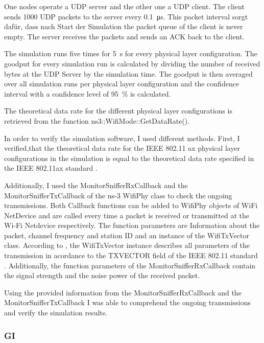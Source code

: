 One nodes operate a UDP server and the other one a UDP client. The client sends \SI{1000}{\byte} UDP packets to the server every \SI{0.1}{\micro\second}. This packet interval
sorgt dafür, dass nach Start der Simulation the packet queue of the client is never empty. The server receives the packets and sends an ACK back to the client.

The simulation runs five times for \SI{5}{\second} for every physical layer configuration.
The goodput for every simulation run is calculated by dividing the number of received bytes at the UDP Server by the simulation time.
The goodput is then averaged over all simulation runs per physical layer configuration and the confidence interval with a confidence level of
\SI{95}{\percent} is calculated.

The theoretical data rate for the different physical layer configurations is retrieved from the function ns3::WifiMode::GetDataRate().

In order to verify the simulation software, I used different methods. First, I verified,that the theoretical data rate for the IEEE 802.11 ax physical layer configurations in
the simulation is equal to the theoretical data rate specified in the IEEE 802.11ax standard \cite{noauthor_ieee_2021}.

Additionally, I used the MonitorSnifferRxCallback and the MonitorSnifferTxCallback of the ns-3 WifiPhy class to check the ongoing transmissions.
Both Callback functions can be added to WifiPhy objects of WiFi NetDevice and are called every time a packet is received or transmitted at the Wi-Fi Netdevice respectively.
The function parameters are Information about the packet, channel frequency and station ID and an instance of the WifiTxVector class. According to \cite{ClassReference},  the WifiTxVector instance describes all parameters of the transmission in
acordance to the TXVECTOR field of the IEEE 802.11 standard \cite{noauthor_ieee_2021}. Additionally, the function parameters of the MonitorSnifferRxCallback contain the signal strength and
the noise power of the received packet.

Using the provided information from the MonitorSnifferRxCallback and the MonitorSnifferTxCallback I was able to comprehend the ongoing transmissions and
verify the simulation results.
\subsubsection*{\acf{GI}}

